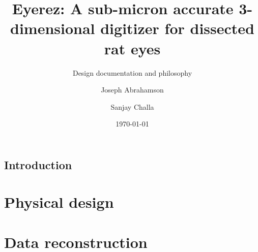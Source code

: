 \documentclass[12pt]{report}
\begin{document}
\frenchspacing

\title{\textbf{Eyerez}: A sub-micron accurate 3-dimensional digitizer
  for dissected rat eyes}
\subtitle{Design documentation and philosophy}
\date{\today}
\author{Joseph Abrahamson \and Sanjay Challa}

\maketitle
\tableofcontents

\newpage

\section{Introduction}
\label{sec:intro}



\chapter{Physical design}


\chapter{Data reconstruction}



\newpage


\end{document}
